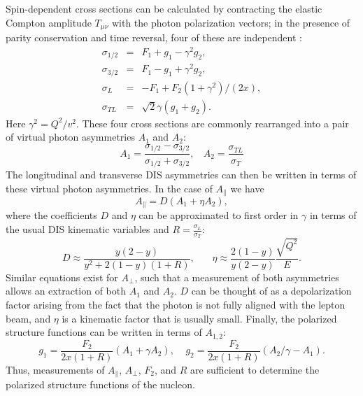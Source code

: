 Spin-dependent cross sections can be calculated by contracting the elastic
Compton amplitude $T_{\mu \nu}$ with the photon polarization vectors; in the
presence of parity conservation and time reversal, four of these are
independent \cite{Close:1979bt}:
%
\begin{eqnarray}
  \sigma_{1/2} & = & F_1 + g_1 - \gamma^2 g_2, \nonumber \\
  \sigma_{3/2} & = & F_1 - g_1 + \gamma^2 g_2, \nonumber \\
  \sigma_L & = & -F_1 + F_2(1+\gamma^2)/(2x),  \nonumber \\
  \sigma_{TL} & = & \sqrt{2}\gamma (g_1+g_2).
\end{eqnarray}
%
Here $\gamma^2 = Q^2/v^2$. These four cross sections are commonly rearranged
into a pair of virtual photon asymmetries $A_1$ and $A_2$:
%
\begin{equation}
  A_1 = \frac{\sigma_{1/2} - \sigma_{3/2}}{\sigma_{1/2} + \sigma_{3/2}}, ~~~~ A_2 = \frac{\sigma_{TL}}{\sigma_T}
\end{equation}
%
The longitudinal and transverse DIS asymmetries can then be written in terms
of these virtual photon asymmetries. In the case of $A_{\parallel}$ we have
\begin{equation}
  A_{\parallel} = D(A_1 + \eta A_2),
\end{equation}
%
where the coefficients $D$ and $\eta$ can be approximated to first order in
$\gamma$ in terms of the usual DIS kinematic variables and $R =
\frac{\sigma_{L}}{\sigma_T}$:
\begin{equation}
  D \approx \frac{y(2-y)}{y^2 + 2(1-y)(1+R)}, ~~~~~~~~ \eta \approx \frac{2(1-y)}{y(2-y)} \frac{\sqrt{Q^2}}{E}.
\end{equation}
%
Similar equations exist for $A_{\perp}$, such that a measurement of both
asymmetries allows an extraction of both $A_1$ and $A_2$. $D$ can be thought
of as a depolarization factor arising from the fact that the photon is not
fully aligned with the lepton beam, and $\eta$ is a kinematic factor that is
usually small. Finally, the polarized structure functions can be written in
terms of $A_{1,2}$:
\begin{equation}
  g_1 = \frac{F_2}{2x(1+R)}(A_1+\gamma A_2), ~~~~~ g_2 = \frac{F_2}{2x(1+R)}(A_2/\gamma - A_1).
\end{equation}
Thus, measurements of $A_{\parallel}$, $A_{\perp}$, $F_2$, and $R$ are
sufficient to determine the polarized structure functions of the nucleon.

